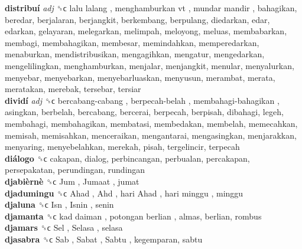 \textbf{distribuí} \emph{adj}  ␝ϲ   lalu lalang ,  menghamburkan vt ,  mundar mandir , bahagikan, beredar, berjalaran, berjangkit, berkembang, berpulang, diedarkan, edar, edarkan, gelayaran, melegarkan, melimpah, meloyong, meluas, membabarkan, membagi, membahagikan, membesar, memindahkan, memperedarkan, menaburkan, mendistribusikan, mengagihkan, mengatur, mengedarkan, mengelilingkan, menghamburkan, menjalar, menjangkit, menular, menyalurkan, menyebar, menyebarkan, menyebarluaskan, menyusun, merambat, merata, meratakan, merebak, tersebar, tersiar  \\
\textbf{dividí} \emph{adj}  ␝ϲ   bercabang-cabang ,  berpecah-belah ,  membahagi-bahagikan , asingkan, berbelah, bercabang, bercerai, berpecah, berpisah, dibahagi, legeh, membahagi, membahagikan, membatasi, membedakan, membelah, memecahkan, memisah, memisahkan, menceraikan, mengantarai, mengasingkan, menjarakkan, menyaring, menyebelahkan, merekah, pisah, tergelincir, terpecah  \\
\textbf{diálogo} ␝ϲ  cakapan, dialog, perbincangan, perbualan, percakapan, persepakatan, perundingan, rundingan  \\
\textbf{djabièrnè} ␝ϲ   Jum ,  Jumaat , jumat  \\
\textbf{djadumingu} ␝ϲ   Ahad ,  Ahd ,  hari Ahad ,  hari minggu , minggu  \\
\textbf{djaluna} ␝ϲ   Isn ,  Isnin , senin  \\
\textbf{djamanta} ␝ϲ   kad daiman ,  potongan berlian , almas, berlian, rombus  \\
\textbf{djamars} ␝ϲ   Sel ,  Selasa , selasa  \\
\textbf{djasabra} ␝ϲ   Sab ,  Sabat ,  Sabtu , kegemparan, sabtu  \\
